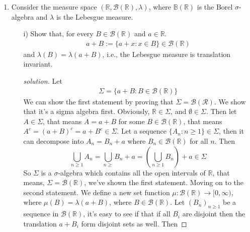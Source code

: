 \documentclass[12pt]{article}
\begin{document}
\begin{enumerate}
\begin{proof}[solution]
					Case 1: $\mu(F_n) = 0$ for all $n \leq N$, that means for all $n$ less than $N$, $F_n \cap (\frac{1}{2}, \frac{1}{2} + \varepsilon_n] = \emptyset$, but that means, if we take the smallest epsilon, call it $\varepsilon_0 = \min_{n \leq N} \varepsilon_n$, then $\bigcup_{n}^N F_n \cap \varepsilon_0 = \emptyset$. \\
					Case 2: There exists some $k \in \mathbb{N}$ such that $\mu(F_k) = 1$, taking the union we just get a bigger set. 
					To show that it's not countably additive, we just need to show that it's not countinuous at $\emptyset$, let $A_n = (\frac{1}{2}, \frac{1}{2} + \frac{1}{n})$, clearly $A_n \downarrow \emptyset$, but $\mu(A_n) \to 1$. 
			\end{proof}
		\item Consider the measure space $(\mathbb{R}, \mathcal{B}(\mathbb{R}), \lambda)$, where $\mathbb{B}(\mathbb{R})$ is the Borel $\sigma$-algebra and $\lambda$ is the Lebesgue measure.
			\begin{itemize}
				\item[i)] Show that, for every $B \in \mathcal{B}(\mathbb{R})$ and $a \in \mathbb{R}$. 
					\begin{align*}
						a+B := \{a+x \colon x \in B\} \in \mathcal{B}(\mathbb{R})
					\end{align*}
					and $\lambda(B) = \lambda(a+B)$, i.e., the Lebesgue measure is translation invariant. 
					\begin{proof}[solution]
						Let
						\begin{align*}
							\Sigma = \{a + B \colon B \in \mathcal{B}(\mathbb{R})\} 
						\end{align*}
						We can show the first statement by proving that $\Sigma = \mathcal{B}(\mathcal{R})$. We show that it's a sigma algebra first. Obviously, $\mathbb{R} \in \Sigma$, and $\emptyset \in \Sigma$. Then let $A \in \Sigma$, that means $A = a + B$ for some $B \in \mathcal{B}(\mathbb{R})$, that means $A^c = (a+B)^c = a + B^c \in \Sigma$. Let a sequence $\{A_n \colon n\geq 1\} \in \Sigma$, then it can decompose into $A_n = B_n + a$ where $B_n \in \mathcal{B}(\mathbb{R})$ for all $n$. Then 
						\begin{equation*}
							\bigcup_{n \geq 1} A_n = \bigcup_{n \geq } B_n + a = \left(\bigcup_{n \geq 1} B_n\right) +a \in \Sigma
						\end{equation*}
						So $\Sigma$ is a $\sigma$-algebra which contains all the open intervals of $\mathbb{R}$, that means, $\Sigma = \mathcal{B}(\mathbb{R})$, we've shown the first statement. Moving on to the second statement. We define a new set function $\mu : \mathcal{B}(\mathbb{R}) \to [0,\infty)$, where $\mu(B) = \lambda(a + B)$, where $B \in \mathcal{B}(\mathbb{R})$. Let $(B_n)_{n \geq 1}$ be a sequence in $\mathcal{B}(\mathbb{R})$, it's easy to see if that if all $B_i$ are disjoint then the translation $a+B_i$ form disjoint sets as well. Then 

\end{proof}
\end{itemize}
\end{enumerate}
\end{document}
